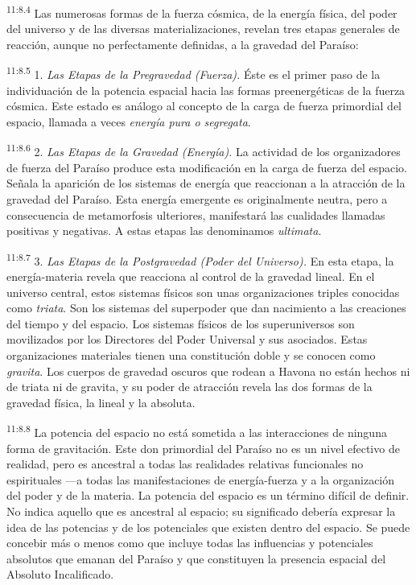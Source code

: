 \par
\textsuperscript{11:8.4} Las numerosas formas de la fuerza cósmica, de la energía física, del poder del universo y de las diversas materializaciones, revelan tres etapas generales de reacción, aunque no perfectamente definidas, a la gravedad del Paraíso:

\par
\textsuperscript{11:8.5} 1. \textit{Las Etapas de la Pregravedad
(Fuerza).} Éste es el primer paso de la individuación de la potencia espacial hacia las formas preenergéticas de la fuerza cósmica. Este estado es análogo al concepto de la carga de fuerza primordial del espacio, llamada a veces \textit{energía pura o segregata}.

\par
\textsuperscript{11:8.6} 2. \textit{Las Etapas de la Gravedad (Energía).} La actividad de los organizadores de fuerza del Paraíso produce esta modificación en la carga de fuerza del espacio. Señala la aparición de los sistemas de energía que reaccionan a la atracción de la gravedad del Paraíso. Esta energía emergente es originalmente neutra, pero a consecuencia de metamorfosis ulteriores, manifestará las cualidades llamadas positivas y negativas. A estas etapas las denominamos \textit{ultimata}.

\par
\textsuperscript{11:8.7} 3. \textit{Las Etapas de la Postgravedad (Poder del Universo).} En esta etapa, la energía-materia revela que reacciona al control de la gravedad lineal. En el universo central, estos sistemas físicos son unas organizaciones triples conocidas como \textit{triata}. Son los sistemas del superpoder que dan nacimiento a las creaciones del tiempo y del espacio. Los sistemas físicos de los superuniversos son movilizados por los Directores del Poder Universal y sus asociados. Estas organizaciones materiales tienen una constitución doble y se conocen como \textit{gravita}. Los cuerpos de gravedad oscuros que rodean a Havona no están hechos ni de triata ni de gravita, y su poder de atracción revela las dos formas de la gravedad física, la lineal y la absoluta.

\par
\textsuperscript{11:8.8} La potencia del espacio no está sometida a las interacciones de ninguna forma de gravitación. Este don primordial del Paraíso no es un nivel efectivo de realidad, pero es ancestral a todas las realidades relativas funcionales no espirituales ---a todas las manifestaciones de energía-fuerza y a la organización del poder y de la materia. La potencia del espacio es un término difícil de definir. No indica aquello que es ancestral al espacio; su significado debería expresar la idea de las potencias y de los potenciales que existen dentro del espacio. Se puede concebir más o menos como que incluye todas las influencias y potenciales absolutos que emanan del Paraíso y que constituyen la presencia espacial del Absoluto Incalificado.

